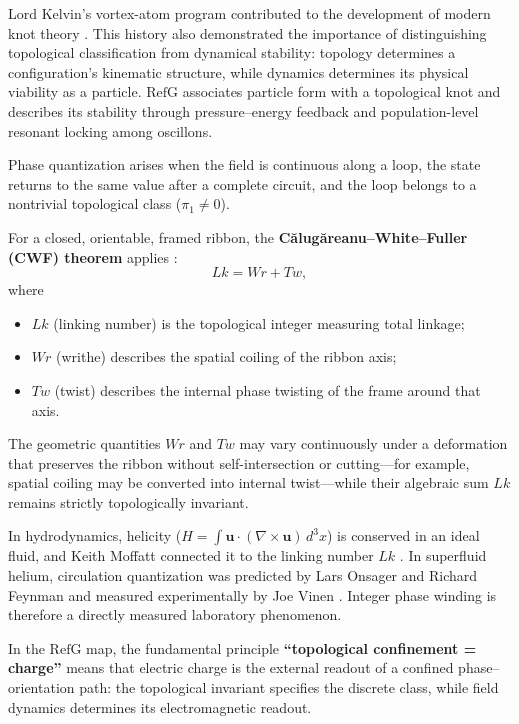 \documentclass[11pt,a4paper]{article}
\newcommand{\RefG}{\mathrm{RefG}}
\begin{document}
Lord Kelvin's vortex-atom program contributed to the development of modern knot theory \citep{thomson1867,thomson1869,tait1877}. This history also demonstrated the importance of distinguishing topological classification from dynamical stability: topology determines a configuration's kinematic structure, while dynamics determines its physical viability as a particle. $\RefG$ associates particle form with a topological knot and describes its stability through pressure--energy feedback and population-level resonant locking among oscillons.

Phase quantization arises when the field is continuous along a loop, the state returns to the same value after a complete circuit, and the loop belongs to a nontrivial topological class ($\pi_1\neq0$).

For a closed, orientable, framed ribbon, the \textbf{Călugăreanu--White--Fuller (CWF) theorem} applies \citep{calugareanu1961,white1969,fuller1971,ricca2011}:
\begin{equation}
Lk = Wr + Tw,
\end{equation}
where
\begin{itemize}
\item $Lk$ (linking number) is the topological integer measuring total linkage;
\item $Wr$ (writhe) describes the spatial coiling of the ribbon axis;
\item $Tw$ (twist) describes the internal phase twisting of the frame around that axis.
\end{itemize}

The geometric quantities $Wr$ and $Tw$ may vary continuously under a deformation that preserves the ribbon without self-intersection or cutting---for example, spatial coiling may be converted into internal twist---while their algebraic sum $Lk$ remains strictly topologically invariant.

In hydrodynamics, helicity ($H=\int \mathbf{u}\cdot(\nabla\times\mathbf{u})\,d^3x$) is conserved in an ideal fluid, and Keith Moffatt connected it to the linking number $Lk$ \citep{moffatt1969}. In superfluid helium, circulation quantization was predicted by Lars Onsager and Richard Feynman \citep{onsager1949,feynman1955} and measured experimentally by Joe Vinen \citep{vinen1961}. Integer phase winding is therefore a directly measured laboratory phenomenon.

In the $\RefG$ map, the fundamental principle \textbf{``topological confinement = charge''} means that electric charge is the external readout of a confined phase--orientation path: the topological invariant specifies the discrete class, while field dynamics determines its electromagnetic readout.
\end{document}

